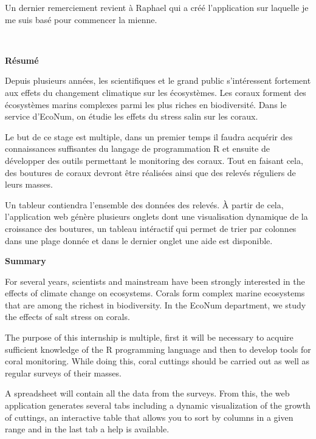 \documentclass[]{report}
\begin{document}
Un dernier remerciement revient à Raphael qui a créé l'application sur
laquelle je me suis basé pour commencer la mienne. \vfill
\null
\newpage

\textcolor{white}{.}

\Huge 
{\bf Résumé} \vspace{1 cm}

\normalsize

Depuis plusieurs années, les scientifiques et le grand public
s'intéressent fortement aux effets du changement climatique sur les
écosystèmes. Les coraux forment des écosystèmes marins complexes parmi
les plus riches en biodiversité. Dans le service d'EcoNum, on étudie les
effets du stress salin sur les coraux.

Le but de ce stage est multiple, dans un premier temps il faudra
acquérir des connaissances suffisantes du langage de programmation R et
ensuite de développer des outils permettant le monitoring des coraux.
Tout en faisant cela, des boutures de coraux devront être réalisées
ainsi que des relevés réguliers de leurs masses.

Un tableur contiendra l'ensemble des données des relevés. À partir de
cela, l'application web génère plusieurs onglets dont une visualisation
dynamique de la croissance des boutures, un tableau intéractif qui
permet de trier par colonnes dans une plage donnée et dans le dernier
onglet une aide est disponible.

\vspace{2 cm}

\Huge 
{\bf Summary} \vspace{1 cm}

\normalsize
For several years, scientists and mainstream have been strongly
interested in the effects of climate change on ecosystems. Corals form
complex marine ecosystems that are among the richest in biodiversity. In
the EcoNum department, we study the effects of salt stress on corals.

The purpose of this internship is multiple, first it will be necessary
to acquire sufficient knowledge of the R programming language and then
to develop tools for coral monitoring. While doing this, coral cuttings
should be carried out as well as regular surveys of their masses.

A spreadsheet will contain all the data from the surveys. From this, the
web application generates several tabs including a dynamic visualization
of the growth of cuttings, an interactive table that allows you to sort
by columns in a given range and in the last tab a help is available.
\end{document}
